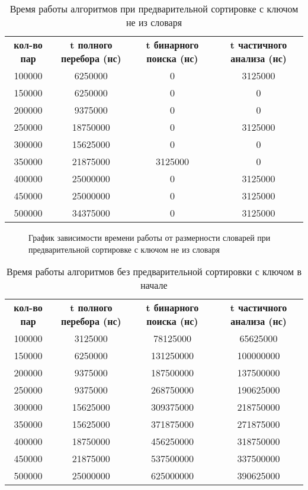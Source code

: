 \begin{table}[ph!]
  \begin{center}
    \captionsetup{justification=raggedright}
     \caption{Время работы алгоритмов при предварительной сортировке с ключом не из словаря}
    \label{tab:workcost_classic}
    \begin{tabular}{c|c|c|c}
      \textbf{кол-во пар} & \textbf{t полного перебора (нс)}  & \textbf{t бинарного поиска (нс)} & \textbf{t частичного анализа (нс)}\\
	100000 & 6250000 & 0 & 3125000\\
	150000 & 6250000 & 0 & 0\\
	200000 & 9375000 & 0 & 0\\
	250000 & 18750000 & 0 & 3125000\\
	300000 & 15625000 & 0 & 0\\
	350000 & 21875000 & 3125000 & 0\\
	400000 & 25000000 & 0 & 3125000\\
	450000 & 25000000 & 0 & 3125000\\
	500000 & 34375000 & 0 & 3125000\\
      \hline	
    \end{tabular}
  \end{center}
\end{table}

\begin{figure}[ph!]
	\caption{График зависимости времени работы от размерности словарей при предварительной сортировке с ключом не из словаря}
\end{figure}

\newpage
\begin{table}[ph!]
  \begin{center}
    \captionsetup{justification=raggedright}
     \caption{Время работы алгоритмов без предварительной сортировки с ключом в начале}
    \label{tab:workcost_classic}
    \begin{tabular}{c|c|c|c}
      \textbf{кол-во пар} & \textbf{t полного перебора (нс)}  & \textbf{t бинарного поиска (нс)} & \textbf{t частичного анализа (нс)}\\
	100000 & 3125000 & 78125000 & 65625000\\
	150000 & 6250000 & 131250000 & 100000000\\
	200000 & 9375000 & 187500000 & 137500000\\
	250000 & 9375000 & 268750000 & 190625000\\
	300000 & 15625000 & 309375000 & 218750000\\
	350000 & 15625000 & 371875000 & 271875000\\
	400000 & 18750000 & 456250000 & 318750000\\
	450000 & 21875000 & 537500000 & 337500000\\
	500000 & 25000000 & 625000000 & 390625000\\
      \hline	
    \end{tabular}
  \end{center}
\end{table}

